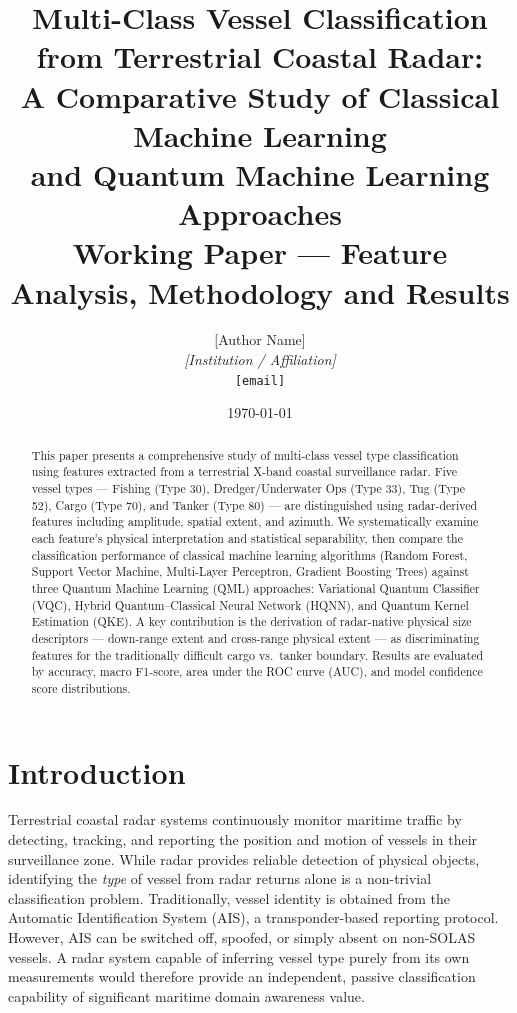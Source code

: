 \documentclass[12pt, a4paper]{article}
\begin{document}
\title{
    \textbf{Multi-Class Vessel Classification from Terrestrial Coastal Radar:\\
    A Comparative Study of Classical Machine Learning\\
    and Quantum Machine Learning Approaches}\\[0.5em]
    \large Working Paper — Feature Analysis, Methodology and Results
}
\author{
    [Author Name]\\
    \textit{[Institution / Affiliation]}\\
    \texttt{[email]}
}
\date{\today}
\maketitle

\begin{abstract}
This paper presents a comprehensive study of multi-class vessel type classification
using features extracted from a terrestrial X-band coastal surveillance radar.
Five vessel types — Fishing (Type 30), Dredger/Underwater Ops (Type 33),
Tug (Type 52), Cargo (Type 70), and Tanker (Type 80) — are distinguished
using radar-derived features including amplitude, spatial extent, and azimuth.
We systematically examine each feature's physical interpretation and statistical
separability, then compare the classification performance of classical machine
learning algorithms (Random Forest, Support Vector Machine, Multi-Layer
Perceptron, Gradient Boosting Trees) against three Quantum Machine Learning
(QML) approaches: Variational Quantum Classifier (VQC), Hybrid Quantum--Classical
Neural Network (HQNN), and Quantum Kernel Estimation (QKE).
A key contribution is the derivation of radar-native physical size descriptors
— down-range extent and cross-range physical extent — as discriminating features
for the traditionally difficult cargo vs.\ tanker boundary.
Results are evaluated by accuracy, macro F1-score, area under the ROC curve (AUC),
and model confidence score distributions.
\end{abstract}

\tableofcontents
\newpage

\section{Introduction}
\label{sec:introduction}

Terrestrial coastal radar systems continuously monitor maritime traffic by
detecting, tracking, and reporting the position and motion of vessels in their
surveillance zone. While radar provides reliable detection of physical objects,
identifying the \emph{type} of vessel from radar returns alone is a non-trivial
classification problem. Traditionally, vessel identity is obtained from the
Automatic Identification System (AIS), a transponder-based reporting protocol.
However, AIS can be switched off, spoofed, or simply absent on non-SOLAS vessels.
A radar system capable of inferring vessel type purely from its own measurements
would therefore provide an independent, passive classification capability of
significant maritime domain awareness value.
\end{document}
